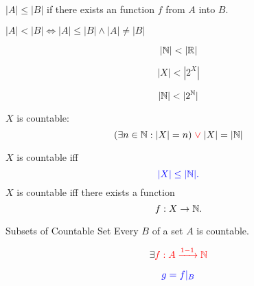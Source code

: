 \begin{frame}{}
\end{frame}

\begin{frame}{}
  \begin{definition}[$|A| \le |B|$]
    $|A| \le |B|$ if there exists an  function $f$ from $A$ into $B$.
  \end{definition}

\end{frame}

\begin{frame}{}
  \begin{definition}[$|A| < |B|$]
    $|A| < |B| \iff |A| \le |B| \land |A| \neq |B|$
  \end{definition}

  \pause
  \[
    |\mathbb{N}| < |\mathbb{R}|
  \]

  \[
    |X| < |2^{X}|
  \]

  \[
    |\mathbb{N}| < |2^{\mathbb{N}}|
  \]
\end{frame}

\begin{frame}{}
  \begin{definition}
    $X$ is countable:
    \[
      (\exists n \in \mathbb{N}: |X| = n) \textcolor{red}{\;\lor\;} |X| = |\mathbb{N}|
    \]
  \end{definition}

  \pause
  \vspace{0.60cm}
  \begin{theorem}
    $X$ is countable iff
    \[
      \textcolor{blue}{|X| \le |\mathbb{N}|.}
    \]
    \pause
    $X$ is countable iff there exists a  function
    \[
      f: X \to \mathbb{N}.
    \]
  \end{theorem}
\end{frame}

\begin{frame}{}
  \begin{exampleblock}{Subsets of Countable Set}
    Every  $B$ of a  set $A$ is countable.
  \end{exampleblock}

  \pause
  \vspace{0.60cm}
  \[
    \exists \textcolor{red}{f: A \xrightarrow{1-1} \mathbb{N}}
  \]

  \pause
  \[
    \textcolor{blue}{g = f|_{B}}
  \]
\end{frame}


